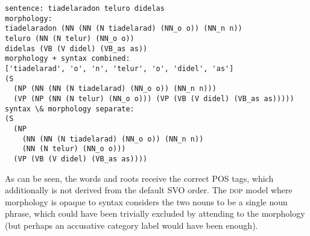 \documentclass[10pt,a4paper]{article}
\begin{document}
\begin{verbatim}
sentence: tiadelaradon teluro didelas
morphology:
tiadelaradon (NN (NN (N tiadelarad) (NN_o o)) (NN_n n))
teluro (NN (N telur) (NN_o o))
didelas (VB (V didel) (VB_as as))
morphology + syntax combined:
['tiadelarad', 'o', 'n', 'telur', 'o', 'didel', 'as']
(S
  (NP (NN (NN (N tiadelarad) (NN_o o)) (NN_n n)))
  (VP (NP (NN (N telur) (NN_o o))) (VP (VB (V didel) (VB_as as)))))
syntax \& morphology separate:
(S
  (NP
    (NN (NN (N tiadelarad) (NN_o o)) (NN_n n))
    (NN (N telur) (NN_o o)))
  (VP (VB (V didel) (VB_as as))))
\end{verbatim}

As can be seen, the words and roots receive the correct POS tags, which
additionally is not derived from the default SVO order.
The \textsc{dop} model where morphology is opaque to syntax considers the two nouns
to be a single noun phrase, which could have been trivially excluded by
attending to the morphology (but perhaps an accusative category label would
have been enough).
\end{document}
